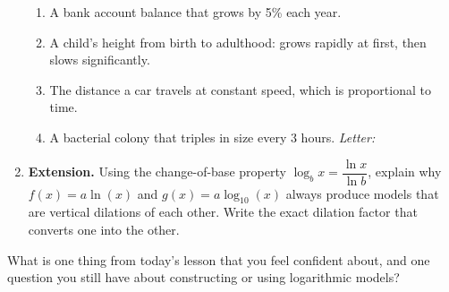 \documentclass[10pt]{article}
\begin{document}
\begin{enumerate}[leftmargin=1.8em, itemsep=14pt]
\vspace{6pt}
\begin{enumerate}[leftmargin=2em, itemsep=4pt, label=(\Alph*)]
  \item A bank account balance that grows by 5\% each year.
  \item A child's height from birth to adulthood: grows rapidly at first, then slows
        significantly.
  \item The distance a car travels at constant speed, which is proportional to time.
  \item A bacterial colony that triples in size every 3 hours. \hfill\textit{Letter:}~\gradedblank[id=hw5, type=choice, points=1, answer=B]{0.42in}{13pt}
\end{enumerate}

\newpage
\item \textbf{Extension.} Using the change-of-base property $\log_b x = \dfrac{\ln x}{\ln b}$,
      explain why $f(x) = a\ln(x)$ and $g(x) = a\log_{10}(x)$ always produce models that
      are vertical dilations of each other. Write the exact dilation factor that converts
      one into the other.

      \rubricbox{\gradedblank[id=hw6, type=rubric, points=2,
  display={Change of base: $\log_{10}(x) = \dfrac{\ln x}{\ln 10}$, so $a\log_{10}(x) = \dfrac{1}{\ln 10}\cdot a\ln(x)$: $g$ is a vertical dilation of $f$ by $\dfrac{1}{\ln 10} \approx 0.4343$ (equivalently $f$ is $g$ stretched by $\ln 10 \approx 2.303$).}]{\linewidth}{42pt}}

\end{enumerate}

\vspace{0.12in}

\begin{reflectionbox}
What is one thing from today's lesson that you feel confident about, and one question you
still have about constructing or using logarithmic models?

\end{reflectionbox}
\end{document}
